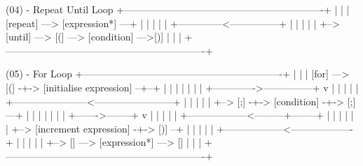 {(04) - Repeat Until Loop
+-------------------------------------------------------------+
|                                                             |
|   [repeat] ---> [expression*] ---+                          |
|                                  |                          |
|   +--------------<---------------+                          |
|   |                                                         |
|   +--> [until] ---> [(] ---> [condition] --->[)]            |
|                                                             |
+-------------------------------------------------------------+


(05) - For Loop
+-------------------------------------------------------------+
|                                                             |
|   [for] ---> [(] -+-> [initialise expression] --+--+        |
|                   |                             |  |        |
|                   +------------->---------------+  v        |
|                                                    |        |
|   +-----------------------<------------------------+        |
|   |                                                         |
|   +--> [;] -+-> [condition] -+-> [;] ---+                   |
|             |                |          |                   |
|             +------->--------+          v                   |
|                                         |                   |
|   +------------------<---------+--------+                   |
|   |                            |                            |
|   +--> [increment expression] -+-> [)] --+                  |
|                                          |                  |
|   +------------------<-------------------+                  |
|   |                                                         |
|   +--> [{] ---> [expression*] ---> [}]                      |
|                                                             |
+-------------------------------------------------------------+


}
